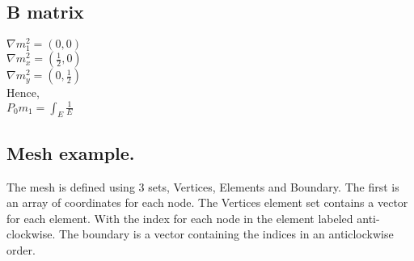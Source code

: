 \documentclass{article}
\begin{document}
\subsection{B matrix}
$\nabla m_1^2 = (0,0)$\\
$\nabla m_x^2 = (\frac{1}{2},0)$ \\
$\nabla m_y^2 = (0,\frac{1}{2})$ \\

Hence, \\
$P_0m_1 = \int_E\frac{1}{E}$

\subsection{Mesh example.}
The mesh is defined using 3 sets, Vertices, Elements and Boundary. The first is an array of coordinates for each node. The Vertices element set contains a vector for each element. With the index for each node in the element labeled anti-clockwise. The boundary is a vector containing the indices in an anticlockwise order.




\end{document}
